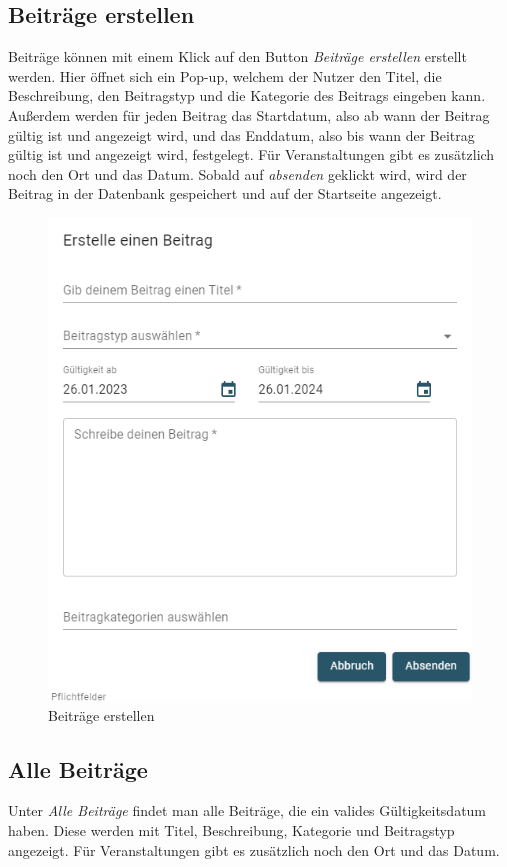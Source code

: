 \subsection{Beiträge erstellen}
\label{sec:createpost}

Beiträge können mit einem Klick auf den Button \textit{Beiträge erstellen} erstellt werden.
Hier öffnet sich ein Pop-up, welchem der Nutzer den Titel, die Beschreibung, den Beitragstyp und die Kategorie des Beitrags eingeben kann.
Außerdem werden für jeden Beitrag das Startdatum, also ab wann der Beitrag gültig ist und angezeigt wird, und das Enddatum, also bis wann der Beitrag gültig ist und angezeigt wird, festgelegt.
Für Veranstaltungen gibt es zusätzlich noch den Ort und das Datum.
Sobald auf \textit{absenden} geklickt wird, wird der Beitrag in der Datenbank gespeichert und auf der Startseite angezeigt.

\begin{figure}[ht!]
  \begin{centering}
    \includegraphics[width=.65\textwidth]{figures/implementation/createpost.png}
    \caption{Beiträge erstellen}
    \label{fig:createpost}
  \end{centering}
\end{figure}


\subsection{Alle Beiträge}
\label{sec:allposts}

Unter \textit{Alle Beiträge} findet man alle Beiträge, die ein valides Gültigkeitsdatum haben. Diese werden mit Titel, Beschreibung, Kategorie und Beitragstyp angezeigt.
Für Veranstaltungen gibt es zusätzlich noch den Ort und das Datum.

